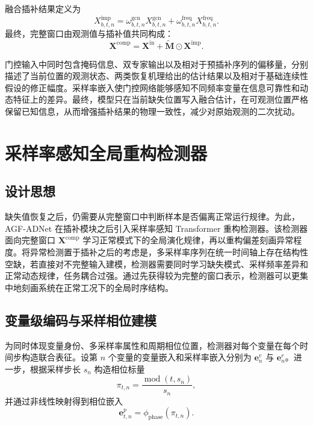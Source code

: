 \documentclass[bachelor, vlined]{DissertUESTC}
\begin{document}
    融合插补结果定义为
    \begin{equation}
        X_{b,t,n}^{\mathrm{imp}}
        =
        \omega_{b,t,n}^{\mathrm{gcn}} X_{b,t,n}^{\mathrm{gcn}}
        +
        \omega_{b,t,n}^{\mathrm{freq}} X_{b,t,n}^{\mathrm{freq}}.
    \end{equation}
    最终，完整窗口由观测值与插补值共同构成：
    \begin{equation}
        \mathbf{X}^{\mathrm{comp}}
        =
        \mathbf{X}^{\mathrm{in}}
        +
        \widetilde{\mathbf{M}} \odot \mathbf{X}^{\mathrm{imp}}.
    \end{equation}
    
    门控输入中同时包含掩码信息、双专家输出以及相对于预插补序列的偏移量，分别描述了当前位置的观测状态、两类恢复机理给出的估计结果以及相对于基础连续性假设的修正幅度。采样率嵌入使门控网络能够感知不同频率变量在信息可靠性和动态特征上的差异。最终，模型只在当前缺失位置写入融合估计，在可观测位置严格保留已知信息，从而增强插补结果的物理一致性，减少对原始观测的二次扰动。
    
    \section{采样率感知全局重构检测器}
    
    \subsection{设计思想}
    
    缺失值恢复之后，仍需要从完整窗口中判断样本是否偏离正常运行规律。为此，AGF-ADNet 在插补模块之后引入采样率感知 Transformer 重构检测器。该检测器面向完整窗口 $\mathbf{X}^{\mathrm{comp}}$ 学习正常模式下的全局演化规律，再以重构偏差刻画异常程度。将异常检测置于插补之后的考虑是，多采样率序列在统一时间轴上存在结构性空缺，若直接对不完整输入建模，检测器需要同时学习缺失模式、采样频率差异和正常动态规律，任务耦合过强。通过先获得较为完整的窗口表示，检测器可以更集中地刻画系统在正常工况下的全局时序结构。
    
    \subsection{变量级编码与采样相位建模}
    
    为同时体现变量身份、多采样率属性和周期相位位置，检测器对每个变量在每个时间步构造联合表征。设第 $n$ 个变量的变量嵌入和采样率嵌入分别为 $\mathbf{e}_n^{v}$ 与 $\mathbf{e}_n^{r}$。进一步，根据采样步长 $s_n$ 构造相位标量
    \begin{equation}
        \pi_{t,n} = \frac{\operatorname{mod}(t,s_n)}{s_n},
    \end{equation}
    并通过非线性映射得到相位嵌入
    \begin{equation}
        \mathbf{e}_{t,n}^{p} = \phi_{\mathrm{phase}}(\pi_{t,n}).
    \end{equation}
    
\end{document}
